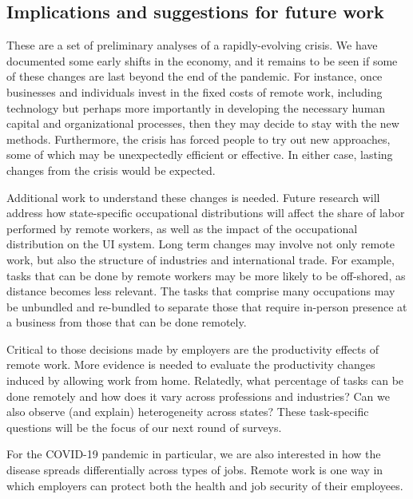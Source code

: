 \documentclass[12pt]{article}
\begin{document}



\subsection{Implications and suggestions for future work}
These are a set of preliminary analyses of a rapidly-evolving crisis. We have documented some early shifts in the economy, and it remains to be seen if some of these changes are last beyond the end of the pandemic. For instance, once businesses and individuals invest in the fixed costs of remote work, including technology but perhaps more importantly in developing the necessary human capital and organizational processes, then they may decide to stay with the new methods.  Furthermore, the crisis has forced people to try out new approaches, some of which may be unexpectedly efficient or effective.  In either case, lasting changes from the crisis would be expected.  

Additional work to understand these changes is needed. Future research will address how state-specific occupational distributions will affect the share of labor performed by remote workers, as well as the impact of the occupational distribution on the UI system.  Long term changes may involve not only remote work, but also  the structure of industries and international trade. For example, tasks that can be done by remote workers may be more likely to be off-shored, as distance becomes less relevant. The tasks that comprise many occupations may be unbundled and re-bundled to separate those that require in-person presence at a business from those that can be done remotely.

Critical to those decisions made by employers are the productivity effects of remote work. More evidence is needed to evaluate the productivity changes induced by allowing work from home. Relatedly, what percentage of tasks can be done remotely and how does it vary across professions and industries? Can we also observe (and explain) heterogeneity across states? These task-specific questions will be the focus of our next round of surveys.

For the COVID-19 pandemic in particular, we are also interested in how the disease spreads differentially across types of jobs. Remote work is one way in which employers can protect both the health and job security of their employees.
\end{document}
